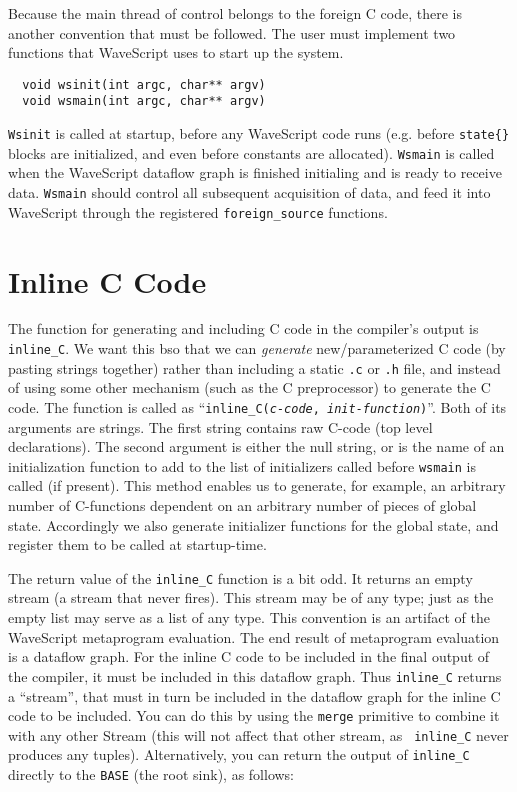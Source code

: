 Because the main thread of control belongs to the foreign C code,
there is another convention that must be followed.  The user must implement
two functions that WaveScript uses to start up the system.

\begin{verbatim}
  void wsinit(int argc, char** argv)
  void wsmain(int argc, char** argv)
\end{verbatim}

{\tt Wsinit} is called at startup, before any WaveScript code runs
(e.g. before {\tt state\{\}} blocks are initialized, and even before
constants are allocated).  {\tt Wsmain} is called when the WaveScript
dataflow graph is finished initialing and is ready to receive data.
{\tt Wsmain} should control all subsequent acquisition of data, and
feed it into WaveScript through the registered {\tt foreign\_source}
functions.



\section{Inline C Code}

The function for generating and including C code in the compiler's
output is {\tt inline\_C}.  We want this bso that we can
{\em generate} new/parameterized C code (by pasting strings together) rather than 
including a static {\tt .c} or {\tt .h} file, and instead of using
some other mechanism (such as the C preprocessor) to generate the C code.
The function  is called as ``{\tt inline\_C({\em c-code},
{\em init-function})}''.  Both of its arguments are strings.  The first
string contains raw C-code (top level declarations).  The second
argument is either the null string, or is the name of an
initialization function to add to the list of initializers called
before {\tt wsmain} is called (if present).  This method enables us to
generate, for example, an arbitrary number of C-functions dependent on
an arbitrary number of pieces of global state.  Accordingly we also
generate initializer functions for the global state, and register them
to be called at startup-time.

The return value of the {\tt inline\_C} function is a bit odd.  It
returns an empty stream (a stream that never fires).  This stream may
be of any type; just as the empty list may serve as a list of any
type.  This convention is an artifact of the WaveScript metaprogram
evaluation.  The end result of metaprogram evaluation is a dataflow
graph.  For the inline C code to be included in the final output of
the compiler, it must be included in this dataflow graph.  Thus {\tt inline\_C}
returns a ``stream'', that must in turn be included in the dataflow
graph for the inline C code to be included.
%
You can do this by using the {\tt merge} primitive to combine it with any
other Stream (this will not affect that other stream, as {\tt
inline\_C} never produces any tuples).  Alternatively, you can return the
output of {\tt inline\_C} directly to the {\tt BASE} (the root sink),
as follows:

